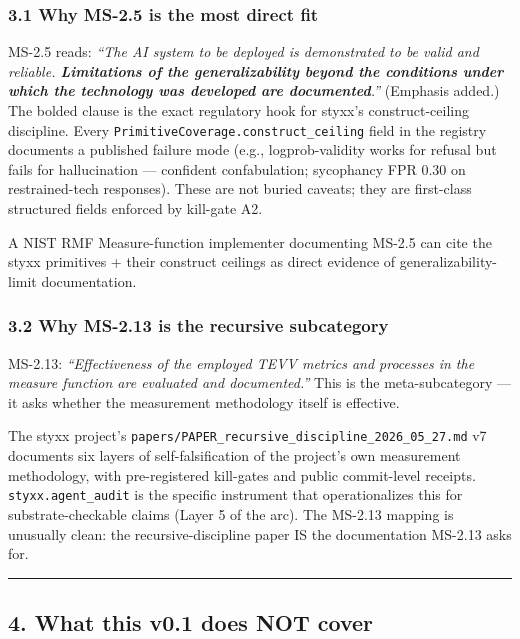 \documentclass[
]{article}
\begin{document}
\subsubsection{3.1 Why MS-2.5 is the most direct
fit}\label{why-ms-2.5-is-the-most-direct-fit}

MS-2.5 reads: \emph{``The AI system to be deployed is demonstrated to be
valid and reliable. \textbf{Limitations of the generalizability beyond
the conditions under which the technology was developed are
documented}.''} (Emphasis added.) The bolded clause is the exact
regulatory hook for styxx's construct-ceiling discipline. Every
\texttt{PrimitiveCoverage.construct\_ceiling} field in the registry
documents a published failure mode (e.g., logprob-validity works for
refusal but fails for hallucination --- confident confabulation;
sycophancy FPR 0.30 on restrained-tech responses). These are not buried
caveats; they are first-class structured fields enforced by kill-gate
A2.

A NIST RMF Measure-function implementer documenting MS-2.5 can cite the
styxx primitives + their construct ceilings as direct evidence of
generalizability-limit documentation.

\subsubsection{3.2 Why MS-2.13 is the recursive
subcategory}\label{why-ms-2.13-is-the-recursive-subcategory}

MS-2.13: \emph{``Effectiveness of the employed TEVV metrics and
processes in the measure function are evaluated and documented.''} This
is the meta-subcategory --- it asks whether the measurement methodology
itself is effective.

The styxx project's
\texttt{papers/PAPER\_recursive\_discipline\_2026\_05\_27.md} v7
documents six layers of self-falsification of the project's own
measurement methodology, with pre-registered kill-gates and public
commit-level receipts. \texttt{styxx.agent\_audit} is the specific
instrument that operationalizes this for substrate-checkable claims
(Layer 5 of the arc). The MS-2.13 mapping is unusually clean: the
recursive-discipline paper IS the documentation MS-2.13 asks for.

\begin{center}\rule{0.5\linewidth}{0.5pt}\end{center}

\subsection{4. What this v0.1 does NOT
cover}\label{what-this-v0.1-does-not-cover}
\end{document}

